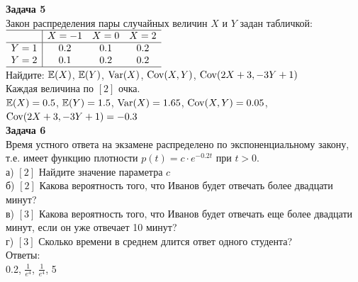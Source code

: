 \documentclass[12pt, a4paper]{article}\usepackage[]{graphicx}\usepackage[]{color}
\begin{document}


\textbf{Задача 5} \\
Закон распределения пары случайных величин $X$ и $Y$ задан табличкой: \\
$\begin{array}{c|ccc}
\hline
 & X=-1 & X=0 & X=2 \\
\hline
Y=1 & 0.2 & 0.1 & 0.2 \\
Y=2 & 0.1 & 0.2 & 0.2 \\
\hline
\end{array}$ \\
Найдите: $\mathbb{E}(X)$, $\mathbb{E}(Y)$, $\operatorname{Var}(X)$, $\operatorname{Cov}(X,Y)$, $\operatorname{Cov}(2X+3,-3Y+1)$ \\
Каждая величина по $[2]$ очка. \\
$\mathbb{E}(X)=0.5$, $\mathbb{E}(Y)=1.5$, $\operatorname{Var}(X)=1.65$, $\operatorname{Cov}(X,Y)=0.05$, $\operatorname{Cov}(2X+3,-3Y+1)=-0.3$ \\

\textbf{Задача 6} \\ %
Время устного ответа на экзамене распределено по экспоненциальному закону, т.е. имеет функцию плотности $p(t)=c\cdot e^{-0.2t}$ при $t>0$. \\
а) $[2]$ Найдите значение параметра $c$ \\
б) $[2]$ Какова вероятность того, что Иванов будет отвечать более двадцати минут? \\
в) $[3]$ Какова вероятность того, что Иванов будет отвечать еще более двадцати минут, если он уже отвечает 10 минут? \\
г) $[3]$ Сколько времени в среднем длится ответ одного студента? \\
Ответы: \\
0.2, $\frac{1}{e^4}$, $\frac{1}{e^4}$, 5 \\
\end{document}
